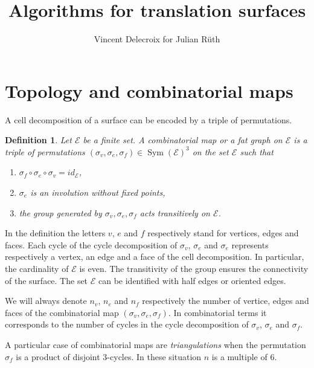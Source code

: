 \documentclass{article}
\title{Algorithms for translation surfaces}
\author{Vincent Delecroix for Julian R\"uth}
\def\cE{\mathcal{E}}
\def\Sym{\operatorname{Sym}}
\newtheorem{definition}{Definition}
\begin{document}
\maketitle

\section{Topology and combinatorial maps}
\label{sec:TriangulationsAndTranslationStructures}

A cell decomposition of a surface can be encoded by a triple of
permutations.
\begin{definition}
Let $\cE$ be a finite set.
A \emph{combinatorial map} or a \emph{fat graph} on $\cE$ is a triple
of permutations $(\sigma_v, \sigma_e, \sigma_f) \in \Sym(\cE)^3$ on
the set $\cE$ such that
\begin{enumerate}
\item $\sigma_f \circ \sigma_e \circ \sigma_v = id_\cE$,
\item $\sigma_e$ is an involution without fixed points,
\item the group generated by $\sigma_v, \sigma_e, \sigma_f$ acts transitively on $\cE$.
\end{enumerate}
\end{definition}
In the definition the letters  $v$, $e$ and $f$ respectively stand for vertices, edges
and faces.  Each cycle of the cycle decomposition of $\sigma_v$, $\sigma_e$
and $\sigma_e$ represents respectively a vertex, an edge
and a face of the cell decomposition. In particular, the cardinality of $\cE$
is even. The transitivity of the group ensures the connectivity of the surface.
The set $\cE$ can be identified with half edges or oriented edges.

We will always denote $n_v$, $n_e$ and $n_f$ respectively the number of vertice,
edges and faces of the combinatorial map $(\sigma_v, \sigma_e, \sigma_f)$. In
combinatorial terms it corresponds to the number of cycles in the cycle decomposition
of $\sigma_v$, $\sigma_e$ and $\sigma_f$.

A particular case of combinatorial maps are \emph{triangulations}
when the permutation $\sigma_f$ is a product of disjoint 3-cycles.
In these situation $n$ is a multiple of $6$.
\end{document}

